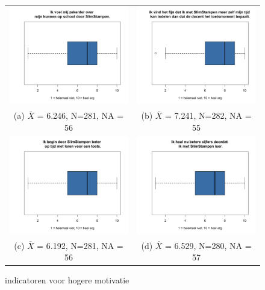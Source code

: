 \documentclass[12pt, a4paper]{article}
\begin{document}
{{\begin{figure}
    \begin{tabular}{cc}
      \includegraphics[width=65mm]{images/24-VoelZekerder.png} &   \includegraphics[width=65mm]{images/27-ZelfTijdIndelen.png} \\
    (a) $\overline{X}$ = 6.246, N=281, NA = 56   & (b) $\overline{X}$ = 7.241, N=282, NA = 55  \\[6pt]
     \includegraphics[width=65mm]{images/29-OpTijdBeginnenLeren.png} &   \includegraphics[width=65mm]{images/30-BetereCijfers.png} \\
    (c) $\overline{X}$ = 6.192, N=281, NA = 56  & (d) $\overline{X}$ = 6.529, N=280, NA = 57  \\[6pt]
    \end{tabular}
    \caption{indicatoren voor hogere motivatie}
    \label{fig:motivatie2}
    \end{figure}

}}
\end{document}
